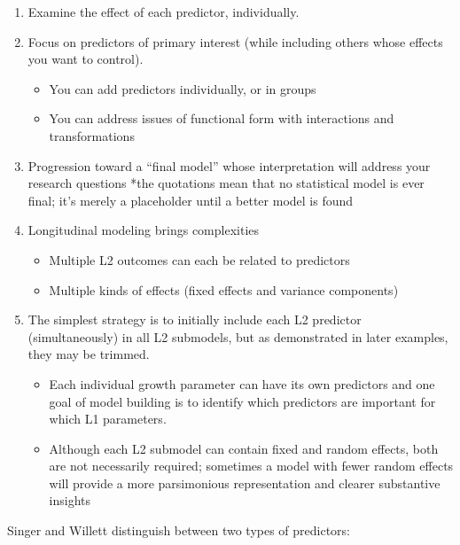 \documentclass[
  11pt,
]{book}
\providecommand{\tightlist}{%
  \setlength{\itemsep}{0pt}\setlength{\parskip}{0pt}}
\begin{document}
\begin{enumerate}
\def\labelenumi{\arabic{enumi}.}
\tightlist
\item
  Examine the effect of each predictor, individually.
\item
  Focus on predictors of primary interest (while including others whose effects you want to control).

  \begin{itemize}
  \tightlist
  \item
    You can add predictors individually, or in groups
  \item
    You can address issues of functional form with interactions and transformations
  \end{itemize}
\item
  Progression toward a ``final model'' whose interpretation will address your research questions
  *the quotations mean that no statistical model is ever final; it's merely a placeholder until a better model is found
\item
  Longitudinal modeling brings complexities

  \begin{itemize}
  \tightlist
  \item
    Multiple L2 outcomes can each be related to predictors
  \item
    Multiple kinds of effects (fixed effects and variance components)
  \end{itemize}
\item
  The simplest strategy is to initially include each L2 predictor (simultaneously) in all L2 submodels, but as demonstrated in later examples, they may be trimmed.

  \begin{itemize}
  \tightlist
  \item
    Each individual growth parameter can have its own predictors and one goal of model building is to identify which predictors are important for which L1 parameters.
  \item
    Although each L2 submodel can contain fixed and random effects, both are not necessarily required; sometimes a model with fewer random effects will provide a more parsimonious representation and clearer substantive insights
  \end{itemize}
\end{enumerate}

Singer and Willett \citeyearpar{singer_applied_2003} distinguish between two types of predictors:
\end{document}
